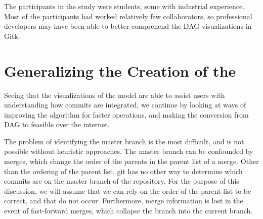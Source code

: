 The participants in the study were students, some with industrial
experience. Most of the participants had worked relatively few
collaborators, so professional developers may have been able to better
comprehend the DAG visualizations in Gitk.

\section{Generalizing the Creation of the \mt}
\label{sub:generalization}

Seeing that the visualizations of the \mt model are able to assist users
with understanding how commits are integrated, we continue by looking at
ways of improving the algorithm for faster operations, and making the
conversion from DAG to \mt feasible over the internet.

The problem of identifying the master branch is the most difficult, and is
not possible without heuristic approaches. The master branch can be
confounded by \foxtrot merges, which change the order of the
parents in the parent list of a merge. Other than the ordering of the
parent list, git has no other way to determine which commits are on the
master branch of the repository. For the purpose of this discussion, we
will assume that we can rely on the order of the parent list to be
correct, and that  do not occur. Furthermore, merge
information is lost in the event of fast-forward merges, which collapse
the branch into the current branch.

